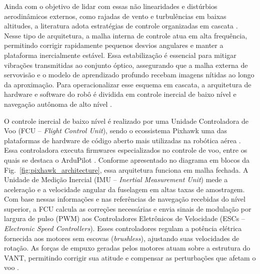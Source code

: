 Ainda com o objetivo de lidar com essas não linearidades e distúrbios aerodinâmicos externos, como rajadas de vento e turbulências em baixas altitudes, a literatura adota estratégias de controle organizadas em cascata \cite{zhang2021}. Nesse tipo de arquitetura, a malha interna de controle atua em alta frequência, permitindo corrigir rapidamente pequenos desvios angulares e manter a plataforma inercialmente estável. Essa estabilização é essencial para mitigar vibrações transmitidas ao conjunto óptico, assegurando que a malha externa de servovisão e o modelo de aprendizado profundo recebam imagens nítidas ao longo da aproximação. Para operacionalizar esse esquema em cascata, a arquitetura de hardware e software do robô é dividida em controle inercial de baixo nível e navegação autônoma de alto nível \cite{shang2016, sciortino2018}.

O controle inercial de baixo nível é realizado por uma Unidade Controladora de Voo (FCU -- \textit{Flight Control Unit}), sendo o ecossistema Pixhawk uma das plataformas de hardware de código aberto mais utilizadas na robótica aérea \cite{shang2016}. Essa controladora executa firmwares especializados no controle de voo, entre os quais se destaca o ArduPilot \cite{sciortino2018}. Conforme apresentado no diagrama em blocos da Fig.~\ref{fig:pixhawk_architecture}, essa arquitetura funciona em malha fechada. A Unidade de Medição Inercial (IMU -- \textit{Inertial Measurement Unit}) mede a aceleração e a velocidade angular da fuselagem em altas taxas de amostragem. Com base nessas informações e nas referências de navegação recebidas do nível superior, a FCU calcula as correções necessárias e envia sinais de modulação por largura de pulso (PWM) aos Controladores Eletrônicos de Velocidade (ESCs -- \textit{Electronic Speed Controllers}). Esses controladores regulam a potência elétrica fornecida aos motores sem escovas (\textit{brushless}), ajustando suas velocidades de rotação. As forças de empuxo geradas pelos motores atuam sobre a estrutura do VANT, permitindo corrigir sua atitude e compensar as perturbações que afetam o voo \cite{sciortino2018}.

